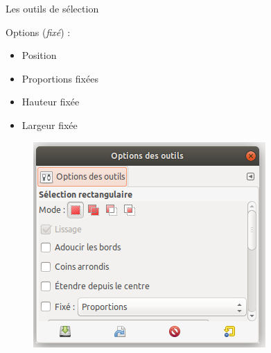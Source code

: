 \begin{frame}{Les outils de sélection}
\begin{overprint}
\begin{enumerate}
{			\vspace{0.5cm}
			\begin{minipage}[t]{0.45\textwidth}
			Options (\textit{fixé}) :

			\begin{itemize}
				\item Position
				\item Proportions fixées
				\item Hauteur fixée
				\item Largeur fixée
			\end{itemize}
			\end{minipage}
			\begin{minipage}[t]{0.45\textwidth}

			\begin{figure}
			    	\centering
			    	\includegraphics[width=\textwidth]{Images/option_outil}
			\end{figure}
			\end{minipage}
	}
\end{enumerate}
\end{overprint}
\end{frame}
